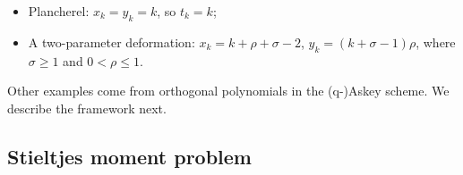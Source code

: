 \documentclass[letterpaper,11pt,oneside,reqno]{article}
\numberwithin{equation}{section}
\theoremstyle{definition}
\begin{document}
\begin{itemize}
	\item Plancherel: $x_k=y_k=k$, so $t_k=k$;
	\item A two-parameter deformation:
		$x_k=k+\rho+\sigma-2$, $y_k=(k+\sigma-1)\rho$,
		where $\sigma\ge 1$ and $0<\rho\le 1$.
\end{itemize}
Other examples come from orthogonal polynomials
in the (q-)Askey scheme. We describe the framework next.

\subsection{Stieltjes moment problem}









\end{document}
